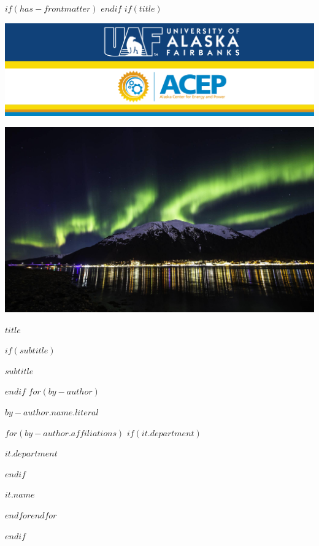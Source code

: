 
$if(has-frontmatter)$
\frontmatter
$endif$
$if(title)$
\cleardoublepage
\thispagestyle{empty}
{\centering
\par\noindent\includegraphics[width=\textwidth]{images/banner_acep_uaf.png}
\vspace{1ex}
\par\noindent\includegraphics[width=\textwidth]{images/jnu_aurora.jpeg}
\\
\vspace{5ex}
{\huge\bfseries\color{uafblue} $title$ \par}
\vspace{2ex}
$if(subtitle)$
{\Large $subtitle$ \par}
$endif$
\vspace{10ex}
$for(by-author)$
{\Large $by-author.name.literal$ \par}
\vspace{3ex}
\vspace{12ex}
$for(by-author.affiliations)$%
$if(it.department)$%
{\bfseries\large $it.department$ \par}
\vspace{3ex}
$endif$%
{\bfseries\large $it.name$ \par}
$endfor$$endfor$%
}
$endif$

